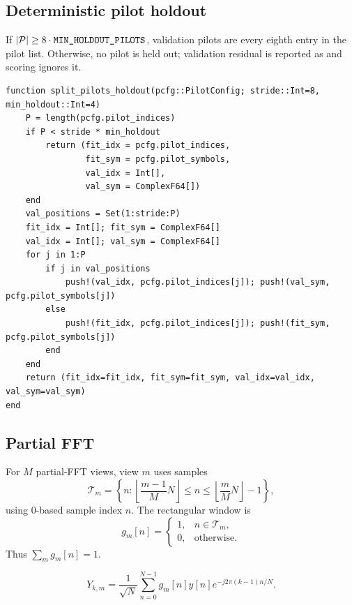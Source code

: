 \documentclass[11pt]{article}
\newcommand{\code}[1]{\texttt{\detokenize{#1}}}
\begin{document}
\subsection{Deterministic pilot holdout}

If $|\mathcal P|\ge 8\cdot \code{MIN_HOLDOUT_PILOTS}$, validation pilots are every eighth entry in the pilot list. Otherwise, no pilot is held out; validation residual is reported as \code{NaN} and scoring ignores it.

\begin{lstlisting}
function split_pilots_holdout(pcfg::PilotConfig; stride::Int=8, min_holdout::Int=4)
    P = length(pcfg.pilot_indices)
    if P < stride * min_holdout
        return (fit_idx = pcfg.pilot_indices,
                fit_sym = pcfg.pilot_symbols,
                val_idx = Int[],
                val_sym = ComplexF64[])
    end
    val_positions = Set(1:stride:P)
    fit_idx = Int[]; fit_sym = ComplexF64[]
    val_idx = Int[]; val_sym = ComplexF64[]
    for j in 1:P
        if j in val_positions
            push!(val_idx, pcfg.pilot_indices[j]); push!(val_sym, pcfg.pilot_symbols[j])
        else
            push!(fit_idx, pcfg.pilot_indices[j]); push!(fit_sym, pcfg.pilot_symbols[j])
        end
    end
    return (fit_idx=fit_idx, fit_sym=fit_sym, val_idx=val_idx, val_sym=val_sym)
end
\end{lstlisting}

\subsection{Partial FFT}

For $M$ partial-FFT views, view $m$ uses samples
\begin{equation}
\mathcal T_m=\left\{n:\left\lfloor\frac{m-1}{M}N\right\rfloor\le n\le \left\lfloor\frac{m}{M}N\right\rfloor-1\right\},
\end{equation}
using 0-based sample index $n$. The rectangular window is
\begin{equation}
g_m[n]=\begin{cases}1,& n\in\mathcal T_m,\\0,&\text{otherwise.}\end{cases}
\end{equation}
Thus $\sum_m g_m[n]=1$.

\begin{equation}
Y_{k,m}=\frac{1}{\sqrt N}\sum_{n=0}^{N-1}g_m[n]y[n]e^{-j2\pi(k-1)n/N}.
\end{equation}
\end{document}
